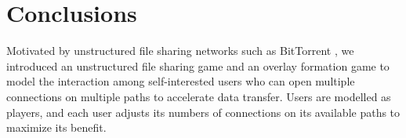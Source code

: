 \documentclass[conference]{IEEEtran}
\begin{document}

%

%

%


\section{Conclusions}
\label{sec:con}


Motivated by unstructured file sharing networks such as BitTorrent
\cite{bt}, we introduced an unstructured file sharing game and an
overlay formation game to model the interaction among
self-interested users who can open multiple connections on
multiple paths to accelerate data transfer. Users are modelled as
players, and each user adjusts its numbers of connections on its
available paths to maximize its benefit.
\end{document}
